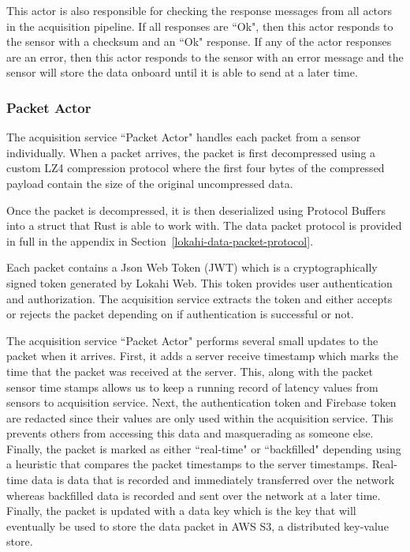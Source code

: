 This actor is also responsible for checking the response messages from all actors in the acquisition pipeline. If all responses are ``Ok", then this actor responds to the sensor with a checksum and an ``Ok" response. If any of the actor responses are an error, then this actor responds to the sensor with an error message and the sensor will store the data onboard until it is able to send at a later time.

\subsubsection{Packet Actor}
The acquisition service ``Packet Actor" handles each packet from a sensor individually. When a packet arrives, the packet is first decompressed using a custom LZ4 compression protocol where the first four bytes of the compressed payload contain the size of the original uncompressed data.

Once the packet is decompressed, it is then deserialized using Protocol Buffers into a struct that Rust is able to work with. The data packet protocol is provided in full in the appendix in Section~\ref{lokahi-data-packet-protocol}.

Each packet contains a Json Web Token (JWT) which is a cryptographically signed token generated by Lokahi Web. This token provides user authentication and authorization. The acquisition service extracts the token and either accepts or rejects the packet depending on if authentication is successful or not.

The acquisition service ``Packet Actor" performs several small updates to the packet when it arrives. First, it adds a server receive timestamp which marks the time that the packet was received at the server. This, along with the packet sensor time stamps allows us to keep a running record of latency values from sensors to acquisition service. Next, the authentication token and Firebase token are redacted since their values are only used within the acquisition service. This prevents others from accessing this data and masquerading as someone else. Finally, the packet is marked as either ``real-time" or ``backfilled" depending using a heuristic that compares the packet timestamps to the server timestamps. Real-time data is data that is recorded and immediately transferred over the network whereas backfilled data is recorded and sent over the network at a later time. Finally, the packet is updated with a data key which is the key that will eventually be used to store the data packet in AWS S3, a distributed key-value store.

